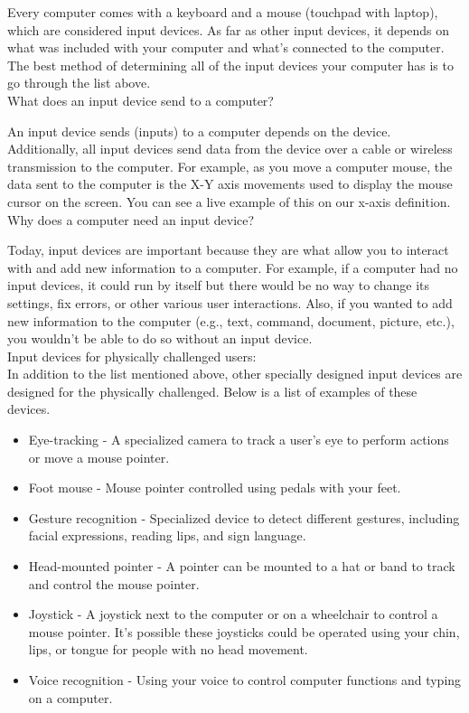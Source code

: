 \documentclass[11pt,a4paper,twoside]{article}
\begin{document}
Every computer comes with a keyboard and a mouse (touchpad with laptop), which are considered input devices. As far as other input devices, it depends on what was included with your computer and what's connected to the computer. The best method of determining all of the input devices your computer has is to go through the list above.\\
What does an input device send to a computer?\par
An input device sends (inputs) to a computer depends on the device. Additionally, all input devices send data from the device over a cable or wireless transmission to the computer. For example, as you move a computer mouse, the data sent to the computer is the X-Y axis movements used to display the mouse cursor on the screen. You can see a live example of this on our x-axis definition.\\
Why does a computer need an input device?\par
Today, input devices are important because they are what allow you to interact with and add new information to a computer. For example, if a computer had no input devices, it could run by itself but there would be no way to change its settings, fix errors, or other various user interactions. Also, if you wanted to add new information to the computer (e.g., text, command, document, picture, etc.), you wouldn't be able to do so without an input device.\\
Input devices for physically challenged users:\\
In addition to the list mentioned above, other specially designed input devices are designed for the physically challenged. Below is a list of examples of these devices.
\begin{itemize}
\item Eye-tracking - A specialized camera to track a user's eye to perform actions or move a mouse pointer.
\item Foot mouse - Mouse pointer controlled using pedals with your feet.
\item Gesture recognition - Specialized device to detect different gestures, including facial expressions, reading lips, and sign language.
\item Head-mounted pointer - A pointer can be mounted to a hat or band to track and control the mouse pointer.
\item Joystick - A joystick next to the computer or on a wheelchair to control a mouse pointer. It's possible these joysticks could be operated using your chin, lips, or tongue for people with no head movement.
\item Voice recognition - Using your voice to control computer functions and typing on a computer.
\end{itemize}
\end{document}
